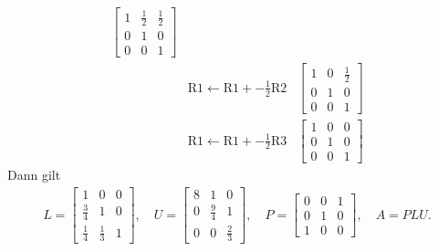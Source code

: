 \documentclass[fleqn,draft,a5paper]{article}
\theoremstyle{remark}
\providecommand{\R}[1]{\mathrm{R#1}}
\begin{document}
\begin{align*}
\begin{bmatrix}
    1 & \frac12 & \frac12 \\
    0 & 1 & 0 \\
    0 & 0 & 1
  \end{bmatrix} \\
 & \R{1} \leftarrow \R{1} + -\frac12 \R{2} &
  \begin{bmatrix}
    1 & 0 & \frac12 \\
    0 & 1 & 0 \\
    0 & 0 & 1
  \end{bmatrix} \\
 & \R{1} \leftarrow \R{1} + - \frac12 \R{3} &
  \begin{bmatrix}
    1 & 0 & 0 \\ 0 & 1 & 0 \\ 0 & 0 & 1
  \end{bmatrix}
\end{align*}
Dann gilt
\begin{align*}
  L =
  \begin{bmatrix}
    1 & 0 & 0 \\
    \frac34 & 1 & 0 \\
    \frac14 & \frac13 & 1
  \end{bmatrix}, \quad
  U =
  \begin{bmatrix}
    8 & 1 & 0 \\
    0 & \frac94 & 1 \\
    0 & 0 & \frac23
  \end{bmatrix}, \quad
  P =
  \begin{bmatrix}
    0 & 0 & 1 \\
    0 & 1 & 0 \\
    1 & 0 & 0
  \end{bmatrix}, \quad A = PLU.
\end{align*}
\end{document}
